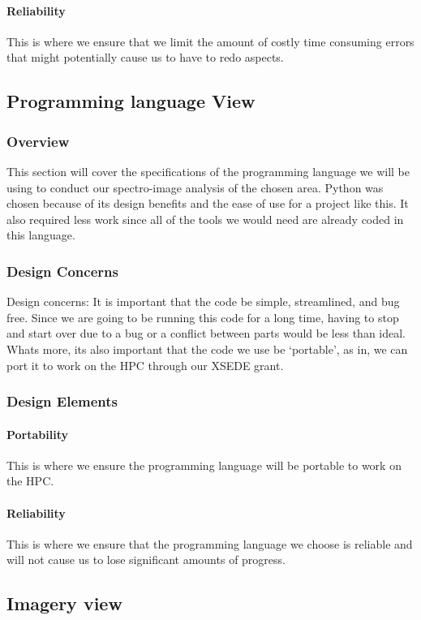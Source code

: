 \documentclass[10pt,draftclsnofoot,onecolumn,journal,compsoc]{IEEEtran}
\begin{document}
\paragraph{Reliability}
This is where we ensure that we limit the amount of costly time consuming errors that might potentially cause us to have to redo aspects.

\subsection{Programming language View}
\subsubsection{Overview}
This section will cover the specifications of the programming language we will be using to conduct our spectro-image analysis of the chosen area. Python was chosen because of its design benefits and the ease of use for a project like this. It also required less work since all of the tools we would need are already coded in this language.
\subsubsection{Design Concerns}
Design concerns: It is important that the code be simple, streamlined, and bug free. Since we are going to be running this code for a long time, having to stop and start over due to a bug or a conflict between parts would be less than ideal. Whats more, its also important that the code we use be ‘portable’, as in, we can port it to work on the HPC through our XSEDE grant.
\subsubsection{Design Elements}
\paragraph{Portability}
This is where we ensure the programming language will be portable to work on the HPC.
\paragraph{Reliability}
This is where we ensure that the programming language we choose is reliable and will not cause us to lose significant amounts of progress.

\subsection{Imagery view}
\end{document}
